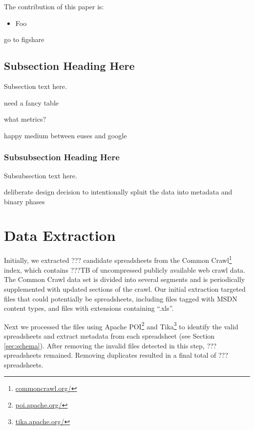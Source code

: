 \documentclass[conference]{IEEEtran}
\begin{document}
The contribution of this paper is:

\begin{itemize}
\item Foo
\end{itemize}

go to figshare

\subsection{Subsection Heading Here}
Subsection text here.

need a fancy table

what metrics?

happy medium between euses and google

\subsubsection{Subsubsection Heading Here}
Subsubsection text here.

deliberate design decision to 
intentionally spluit the data into metadata and binary phases

\section{Data Extraction}
Initially, we extracted ??? candidate spreadsheets from the Common Crawl\footnote{\url{commoncrawl.org/}} index, which contains ???TB of uncompressed publicly available web crawl data. 
The Common Crawl data set is divided into several segments and is periodically supplemented with updated sections of the crawl. 
Our initial extraction targeted files that could potentially be spreadsheets, including files tagged with MSDN content types, and files with extensions containing ``.xls''.

Next we processed the files using Apache POI\footnote{\url{poi.apache.org/}} and Tika\footnote{\url{tika.apache.org/}} to identify the valid spreadsheets and extract metadata from each spreadsheet (see Section \ref{sec:schema}). After removing the invalid files detected in this step, ??? spreadsheets remained. Removing duplicates resulted in a final total of ??? spreadsheets. 



\end{document}

